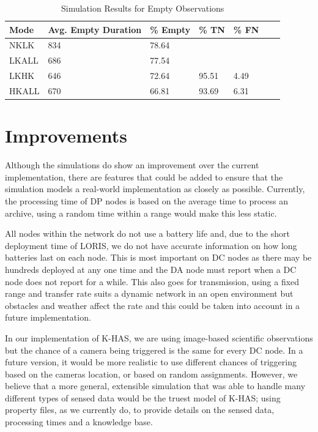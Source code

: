 \begin{table}[h]\footnotesize
\begin{tabularx}{\textwidth}{ |X|X|X|X|X|X|X| }
\hline
Mode & Avg. Empty Duration & \% Empty & \% TN & \% FN \\
\hline
NKLK & 834 & 78.64 & &  \\
LKALL & 686 & 77.54 & & \\
LKHK & 646 & 72.64 & 95.51 & 4.49 \\
HKALL & 670 & 66.81 & 93.69 & 6.31 \\
\hline
\end{tabularx}
\caption{Simulation Results for Empty Observations}\label{tab:observ_empty}
\end{table}
	
\section{Improvements}
Although the simulations do show an improvement over the current implementation, there are features that could be added to ensure that the simulation models a real-world implementation as closely as possible. Currently, the processing time of DP nodes is based on the average time to process an archive, using a random time within a range would make this less static. 

All nodes within the network do not use a battery life and, due to the short deployment time of LORIS, we do not have accurate information on how long batteries last on each node. This is most important on DC nodes as there may be hundreds deployed at any one time and the DA node must report when a DC node does not report for a while. This also goes for transmission, using a fixed range and transfer rate suits a dynamic network in an open environment but obstacles and weather affect the rate and this could be taken into account in a future implementation.

In our implementation of K-HAS, we are using image-based scientific observations but the chance of a camera being triggered is the same for every DC node. In a future version, it would be more realistic to use different chances of triggering based on the cameras location, or based on random assignments. However, we believe that a more general, extensible simulation that was able to handle many different types of sensed data would be the truest model of K-HAS; using property files, as we currently do, to provide details on the sensed data, processing times and a knowledge base.

